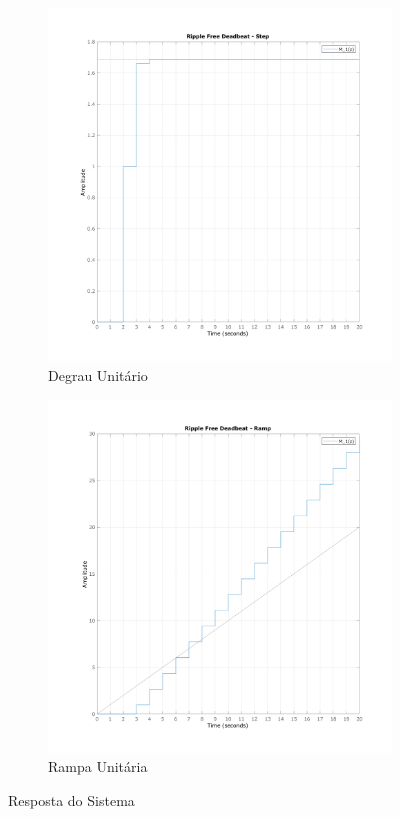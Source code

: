 \documentclass[a4paper,11pt]{article}
\begin{document}
\begin{figure}[H]
    \centering
    \begin{subfigure}[m]{0.49\linewidth}
        \centering
        \includegraphics[width=1\linewidth]{img/exsim5-g1-deadbeat-sim.png}
        \caption{Degrau Unitário}
    \end{subfigure}
    \hfill
    \begin{subfigure}[m]{0.49\linewidth}
        \centering
        \includegraphics[width=1\linewidth]{img/exsim5-g1-ramp-sim.png}
        \caption{Rampa Unitária}
    \end{subfigure}
    \caption{Resposta do Sistema}
\end{figure}
\end{document}
